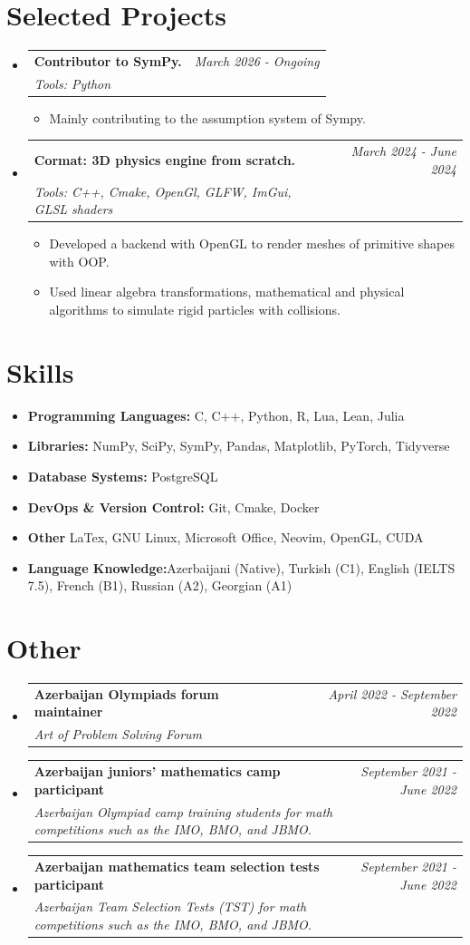 \documentclass[a4paper,11pt]{article}
\makeatletter
\newcommand{\resumeItem}[2]{
\item{
        \textbf{#1}{\hspace{0.5mm}#2 \vspace{-0.5mm}}
    }
}
\newcommand{\resumeProject}[4]{
    \vspace{-0.5mm}
\item
    \begin{tabular*}{0.98\textwidth}[t]{l@{\extracolsep{\fill}}r}
        \textbf{#1} & \textit{\footnotesize{#3}} \\
        \footnotesize{\textit{#2}} & \footnotesize{#4}
    \end{tabular*}
    \vspace{-3mm}
}
\newcommand{\resumeSubItem}[2]{\resumeItem{#1}{#2}\vspace{-4pt}}
\newcommand{\resumeSubHeadingListStart}{
\begin{itemize}[leftmargin=*,labelsep=1mm]}
\newcommand{\resumeHeadingSkillStart}{
        \begin{itemize}[leftmargin=*,itemsep=0.8mm, rightmargin=2ex]}
\newcommand{\resumeItemListStart}{
                \begin{itemize}[leftmargin=*,labelsep=1mm,itemsep=0.5mm]}
\newcommand{\resumeSubHeadingListEnd}{
                    \end{itemize}\vspace{-2mm}}
\newcommand{\resumeHeadingSkillEnd}{
            \end{itemize}\vspace{-2mm}}
\newcommand{\resumeItemListEnd}{
    \end{itemize}\vspace{-2mm}}
\makeatother
\begin{document}
\section{\textbf{Selected Projects}}
\resumeSubHeadingListStart


\resumeProject
{Contributor to SymPy.}
{Tools: Python}
{March 2026 - Ongoing}
{{}\href{https://github.com/sympy/sympy/pulls?q=author\%3AJosephMehdiyev}{\textcolor{darkblue}{\faGithub}}}
\resumeItemListStart
\item Mainly contributing to the assumption system of Sympy.
\resumeItemListEnd


\resumeProject
{Cormat: 3D physics engine from scratch.}
{Tools: C++, Cmake, OpenGl, GLFW, ImGui, GLSL shaders}
{March 2024 - June 2024}
{{}\href{https://github.com/JosephMehdiyev/cormat}{\textcolor{darkblue}{\faGithub}}}
\resumeItemListStart
\item Developed a backend with OpenGL to render meshes of primitive shapes with OOP.
\item Used linear algebra transformations, mathematical and physical algorithms to simulate rigid particles with collisions.
\resumeItemListEnd

\resumeSubHeadingListEnd

\vspace{-3mm}
\section{\textbf{Skills}}
\resumeHeadingSkillStart
\resumeSubItem{Programming Languages:}
{ C, C++, Python, R, Lua, Lean, Julia}
\resumeSubItem{Libraries:}
{ NumPy, SciPy, SymPy, Pandas, Matplotlib, PyTorch, Tidyverse}
\resumeSubItem{Database Systems:}
{ PostgreSQL}
\resumeSubItem{DevOps \& Version Control:}
{ Git, Cmake, Docker }
\resumeSubItem{Other}
{ LaTex, GNU Linux, Microsoft Office, Neovim, OpenGL, CUDA}
\resumeSubItem{Language Knowledge:}
{Azerbaijani (Native), Turkish (C1), English (IELTS 7.5), French (B1), Russian (A2), Georgian (A1)}
\resumeHeadingSkillEnd
\section{\textbf{Other}}
\resumeSubHeadingListStart
\resumeProject
{Azerbaijan Olympiads forum maintainer}
{Art of Problem Solving Forum}
{April 2022 - September 2022}
{{}\href{https://artofproblemsolving.com/community/user/948405}{\textcolor{darkblue}{\faIcon{globe}}}}


\resumeProject
{Azerbaijan juniors' mathematics camp participant}
{Azerbaijan Olympiad camp training students for math competitions such as the IMO, BMO, and JBMO.}
{September 2021 - June 2022}
{}
\resumeProject
{Azerbaijan mathematics team selection tests participant}
{Azerbaijan Team Selection Tests (TST) for math competitions such as the IMO, BMO, and JBMO.}
{September 2021 - June 2022}
{}
\resumeSubHeadingListEnd
\end{document}
